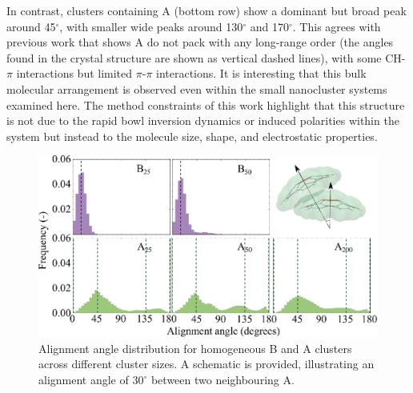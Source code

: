In contrast, clusters containing A (bottom row) show a dominant but broad peak around 45$^{\circ}$, with smaller wide peaks around 130$^{\circ}$ and 170$^{\circ}$. 
This agrees with previous work that shows A do not pack with any long-range order \cite{hanson1976crystal,Petrukhina2005,kanao2018differentiating,wang2015electronic,scott1999geodesic} (the angles found in the crystal structure are shown as vertical dashed lines), with some CH-$\pi$ interactions but limited $\pi$-$\pi$ interactions. It is interesting that this bulk molecular arrangement is observed even within the small nanocluster systems examined here. The method constraints of this work highlight that this structure is not due to the rapid bowl inversion dynamics or induced polarities within the system but instead to the molecule size, shape, and electrostatic properties.

%
\begin{figure}[!tbh]
\centering
\includegraphics[width=0.84\linewidth]{Figures/alignment_angles_homo.eps}
\caption{Alignment angle distribution for homogeneous B and A clusters across different cluster sizes. A schematic is provided, illustrating an alignment angle of $30^{\circ}$ between two neighbouring A.}
\label{fig:alignmentangles_homo}
\end{figure}
%

